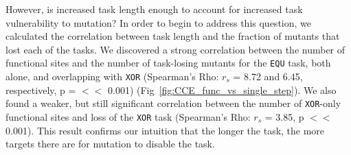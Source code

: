 \documentclass[10pt,letterpaper]{article}
\begin{document}
However, is increased task length enough to account for increased task vulnerability to mutation? In order to begin to address this question, we calculated the correlation between task length and the fraction of mutants that lost each of the tasks. We discovered a strong correlation between the number of functional sites and the number of task-losing mutants for the \texttt{EQU} task, both alone, and overlapping with \texttt{XOR} (Spearman's Rho: $r_s$ = 8.72 and 6.45, respectively, p = $<<$ 0.001) (Fig~\ref{fig:CCE_func_vs_single_step}). We also found a weaker, but still significant correlation between the number of \texttt{XOR}-only functional sites and loss of the \texttt{XOR} task (Spearman's Rho: $r_s$ = 3.85, p $<<$ 0.001). This result confirms our intuition that the longer the task, the more targets there are for mutation to disable the task.
\end{document}
